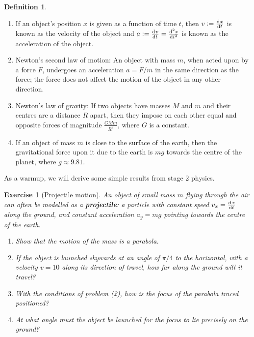 \documentclass[a4paper,leqno,9pt]{article}
\theoremstyle{exercise}
\newtheorem{Exercise}{Exercise}
\newenvironment{exercise}
  {\begin{mdframed}\begin{Exercise}}
  {\end{Exercise}\end{mdframed}}
\theoremstyle{plain}
\theoremstyle{definition}
\newtheorem*{defn}{Definition}
\theoremstyle{remark}
\newcommand{\df}{\textbf}
\begin{document}
\begin{defn}\leavevmode
  \begin{enumerate}
    \item If an object's position $ x $ is given as a function of time $ t $, then $ v := \od{x}{t} $ is known as
          the velocity of the object and $ a := \od{v}{t} = \od[2]{x}{t} $ is known as the acceleration of the object.
    \item Newton's second law of motion: An object with mass $ m $, when acted upon by a force $ F $, undergoes an acceleration $ a = F/m $ in
          the same direction as the force; the force does not affect the motion of the object in any other direction.
    \item Newton's law of gravity: If two objects have masses $ M $ and $ m $ and their centres are a distance $ R $ apart, then they impose
          on each other equal and opposite forces of magnitude $ \frac{GMm}{R^2} $, where $ G $ is a constant.
    \item If an object of mass $ m $ is close to the surface of the earth, then the gravitational force upon it
          due to the earth is $ mg $ towards the centre of the planet, where $ g \approx 9.81 $.
  \end{enumerate}
\end{defn}

As a warmup, we will derive some simple results from stage 2 physics.

\begin{exercise}[Projectile motion]
  An object of small mass $ m $ flying through the air can often be modelled as a \df{projectile}: a particle
  with constant speed $ v_x = \od{x}{t} $ along the ground, and constant acceleration $ a_y = mg $ pointing
  towards the centre of the earth.

  \begin{enumerate}
    \item Show that the motion of the mass is a parabola.
    \item If the object is launched skywards at an angle of $ \pi/4 $ to the horizontal, with a
           velocity $ v = 10 $ along its direction of travel, how far along the ground will it travel?
    \item With the conditions of problem (2), how is the focus of the parabola traced positioned?
    \item At what angle must the object be launched for the focus to lie precisely on the ground?
  \end{enumerate}
\end{exercise}
\end{document}
